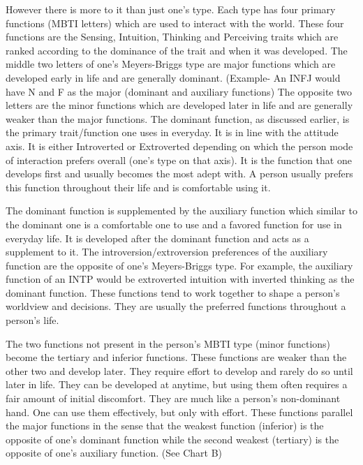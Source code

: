 However there is more to it than just one's type. Each type has four primary functions (MBTI letters) which are used to interact with the world. These four functions are the Sensing, Intuition, Thinking and Perceiving traits which are ranked according to the dominance of the trait and when it was developed. The middle two letters of one's Meyers-Briggs type are major functions which are developed early in life and are generally dominant. (Example- An INFJ would have N and F as the major (dominant and auxiliary functions) The opposite two letters are the minor functions which are developed later in life and are generally weaker than the major functions. The dominant function, as discussed earlier, is the primary trait/function one uses in everyday. It is in line with the attitude axis. It is either Introverted or Extroverted depending on which the person mode of interaction prefers overall (one's type on that axis). It is the function that one develops first and usually becomes the most adept with. A person usually prefers this function throughout their life and is comfortable using it.

	The dominant function is supplemented by the auxiliary function which similar to the dominant one is a comfortable one to use and a favored function for use in everyday life. It is developed after the dominant function and acts as a supplement to it. The introversion/extroversion preferences of the auxiliary function are the opposite of one's Meyers-Briggs type. For example, the auxiliary function of an INTP would be extroverted intuition with inverted thinking as the dominant function. These functions tend to work together to shape a person's worldview and decisions. They are usually the preferred functions throughout a person's life.
	
	The two functions not present in the person's MBTI type (minor functions) become the tertiary and inferior functions. These functions are weaker than the other two and develop later. They require effort to develop and rarely do so until later in life. They can be developed at anytime, but using them often requires a fair amount of initial discomfort. They are much like a person's non-dominant hand. One can use them effectively, but only with effort. These functions parallel the major functions in the sense that the weakest function (inferior) is the opposite of one's dominant function while the second weakest (tertiary) is the opposite of one's auxiliary function. (See Chart B)
	
